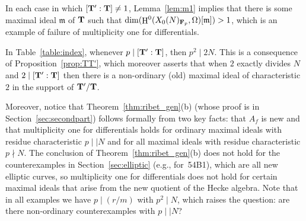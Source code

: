 \documentclass[10pt,twoside]{article}
\newcommand{\edit}[1]{\footnote{EDIT: #1}\marginpar{\hfill {\sf \thefootnote}}}
\newcommand{\Z}{{\bf{Z}}}
\newcommand{\F}{{\bf{F}}}
\newcommand{\T}{{\bf{T}}}
\newcommand{\m}{{\mathfrak{m}}}
\newcommand{\Fp}{{{\F}_p}}
\newcommand{\isom}{\cong}
\renewcommand{\H}{\HHH}
\theoremstyle{definition}
\DeclareMathOperator{\HHH}{H}
\begin{document}
In each case in which $[\T':\T]\neq 1$, Lemma~\ref{lem:m1} implies
that there is some maximal ideal $\m$ of $\T$ such that
$\dim(\H^0(X_0(N)_{\Fp},\Omega)[\m])>1$, which is an example
of failure of multiplicity one for differentials.


In Table~\ref{table:index}, whenever $p\mid [\T':\T]$, then $p^2\mid
2N$.  This is a consequence of Proposition~\ref{prop:TT'}, which
moreover asserts that when $2$ exactly divides $N$ and $2\mid[\T':\T]$
then there is a non-ordinary (old) maximal ideal of characteristic $2$
in the support of $\T'/\T$.


Moreover, notice that
Theorem~\ref{thm:ribet_gen}(b) (whose proof is in 
Section~\ref{sec:secondpart})
follows formally from two
key facts: that $A_f$ is new and that multiplicity one for differentials
holds for ordinary maximal ideals with residue characteristic
$p\mid\mid N$ and for all maximal ideals with residue
characteristic $p\nmid N$.  The conclusion of
Theorem~\ref{thm:ribet_gen}(b) does not hold for the counterexamples
in Section~\ref{sec:elliptic} (e.g., for~54B1), which are
all new elliptic curves, so multiplicity one for
differentials does not hold for certain 
maximal ideals that arise from the new quotient of the Hecke algebra.
Note that in all examples we have $p\mid(r/m)$ with $p^2\mid N$,
which raises the question: are there non-ordinary counterexamples
with $p\mid\mid N$?

\end{document}
